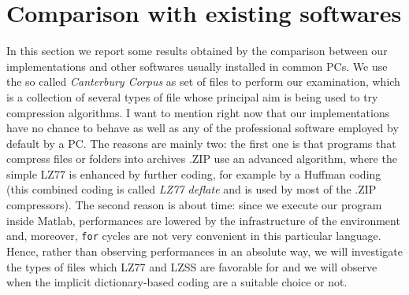 \section{Comparison with existing softwares}
In this section we report some results obtained by the comparison between our implementations and other softwares usually installed in common PCs. We use the so called \textit{Canterbury Corpus} as set of files to perform our examination, which is a collection of several types of file whose principal aim is being used to try compression algorithms. I want to mention right now that our implementations have no chance to behave as well as any of the professional software employed by default by a PC. The reasons are mainly two: the first one is that programs that compress files or folders into archives .ZIP use an advanced algorithm, where the simple LZ77 is enhanced by further coding, for example by a Huffman coding (this combined coding is called \textit{LZ77 deflate} and is used by most of the .ZIP compressors). The second reason is about time: since we execute our program inside Matlab, performances are lowered by the infrastructure of the environment and, moreover, \texttt{for} cycles are not very convenient in this particular language. Hence, rather than observing performances in an absolute way, we will investigate the types of files which LZ77 and LZSS are favorable for and we will observe when the implicit dictionary-based coding are a suitable choice or not.
